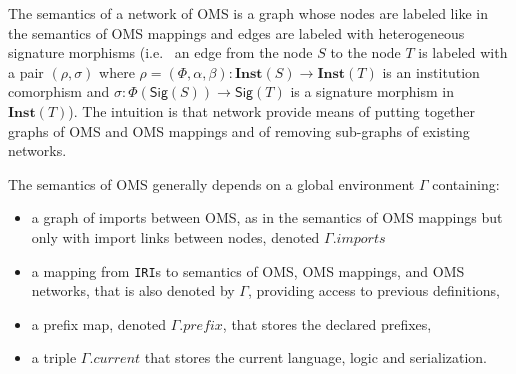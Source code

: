 \documentclass[10pt,fleqn,final]{scrreprt}
\newcommand*{\syntax}[1]{\texttt{#1}}
\newcommand{\Sig}{\mathsf{Sig}}
\newcommand{\Inst}{\ensuremath{\mathbf{Inst}}}
\newcommand{\prefix}{\mathit{prefix}}
\newcommand{\current}{\mathit{current}}
\newenvironment{definitions}[0]{\medskip }{}
\begin{document}
\begin{definitions}
The semantics of a network of OMS is a graph
whose nodes are labeled like in the semantics of OMS mappings and 
edges are labeled with heterogeneous signature morphisms (i.e.~ 
an edge from the node $S$ to the node $T$ is labeled with a pair 
$(\rho, \sigma)$ where $\rho=(\Phi,\alpha,\beta):\Inst(S)\to\Inst(T)$ is an institution comorphism and
$\sigma:\Phi(\Sig(S))\to\Sig(T)$ is a signature morphism in $\Inst(T)$). 
The intuition is that
network provide means of putting together graphs of OMS and OMS mappings
and of removing sub-graphs of existing networks. 

The semantics of OMS generally depends on a global environment
$\Gamma$ containing:
 \begin{itemize}
    \item a graph of imports between OMS, as in the semantics of OMS mappings but
          only with import links between nodes, denoted $\Gamma.imports$
    \item a mapping from \syntax{IRI}s to semantics of OMS, OMS mappings, and OMS networks, that 
               is also denoted by $\Gamma$, providing access to previous definitions,
    \item a prefix map, denoted $\Gamma.\prefix$, that stores the declared prefixes,
    \item a triple $\Gamma.\current$ that stores the current language, logic and serialization. 
 \end{itemize}


\end{definitions}
\end{document}
